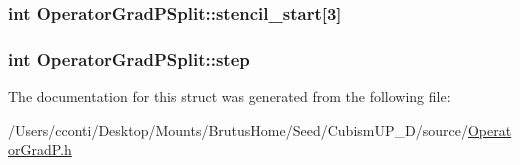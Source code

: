 \subsubsection[{stencil\+\_\+start}]{\setlength{\rightskip}{0pt plus 5cm}int Operator\+Grad\+P\+Split\+::stencil\+\_\+start\mbox{[}3\mbox{]}}\label{struct_operator_grad_p_split_a53e3860439ef1e9344117f7e31f51ecc}
\hypertarget{struct_operator_grad_p_split_a3c2c3f52bff9a44096d838acd2ad396b}{}
\subsubsection[{step}]{\setlength{\rightskip}{0pt plus 5cm}int Operator\+Grad\+P\+Split\+::step}\label{struct_operator_grad_p_split_a3c2c3f52bff9a44096d838acd2ad396b}


The documentation for this struct was generated from the following file\+:\begin{DoxyCompactItemize}
\item 
/\+Users/cconti/\+Desktop/\+Mounts/\+Brutus\+Home/\+Seed/\+Cubism\+U\+P\+\_\+D/source/\hyperlink{_operator_grad_p_8h}{Operator\+Grad\+P.\+h}\end{DoxyCompactItemize}
